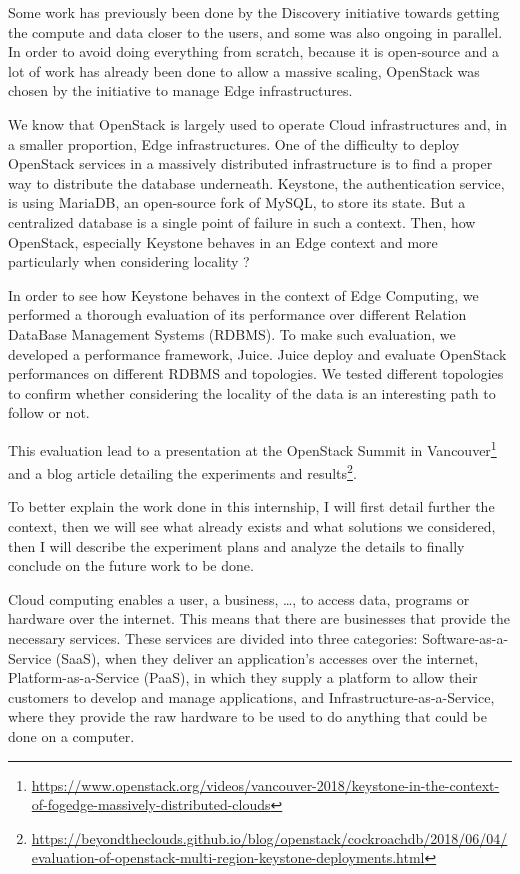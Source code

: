 Some work has previously been done by the Discovery initiative towards getting the compute and data closer to the users, and some was also ongoing in parallel. In order to avoid doing everything from scratch, because it is open-source and a lot of work has already been done to allow a massive scaling, OpenStack was chosen by the initiative to manage Edge infrastructures.

We know that OpenStack is largely used to operate Cloud infrastructures and, in a smaller proportion, Edge infrastructures. One of the difficulty to deploy OpenStack services in a massively distributed infrastructure is to find a proper way to distribute the database underneath. Keystone, the authentication service, is using MariaDB, an open-source fork of MySQL, to store its state. But a centralized database is a single point of failure in such a context.
Then, how OpenStack, especially Keystone behaves in an Edge context and more particularly when considering locality ?

In order to see how Keystone behaves in the context of Edge Computing, we performed a thorough evaluation of its performance over different Relation DataBase Management Systems (RDBMS). To make such evaluation, we developed a performance framework, Juice. Juice deploy and evaluate OpenStack performances on different RDBMS and topologies. We tested different topologies to confirm whether considering the locality of the data is an interesting path to follow or not.

This evaluation lead to a presentation at the OpenStack Summit in Vancouver\footnote{\url{https://www.openstack.org/videos/vancouver-2018/keystone-in-the-context-of-fogedge-massively-distributed-clouds}} and a blog article detailing the experiments and results\footnote{\url{https://beyondtheclouds.github.io/blog/openstack/cockroachdb/2018/06/04/evaluation-of-openstack-multi-region-keystone-deployments.html}}.

To better explain the work done in this internship, I will first detail further the context, then we will see what already exists and what solutions we considered, then I will describe the experiment plans and analyze the details to finally conclude on the future work to be done.

\iffalse

\newpage


Cloud computing enables a user, a business, \dots, to access data, programs or hardware over the internet. This means that there are businesses that provide the necessary services. These services are divided into three categories: Software-as-a-Service (SaaS), when they deliver an application's accesses over the internet, Platform-as-a-Service (PaaS), in which they supply a platform to allow their customers to develop and manage applications, and Infrastructure-as-a-Service, where they provide the raw hardware to be used to do anything that could be done on a computer.

